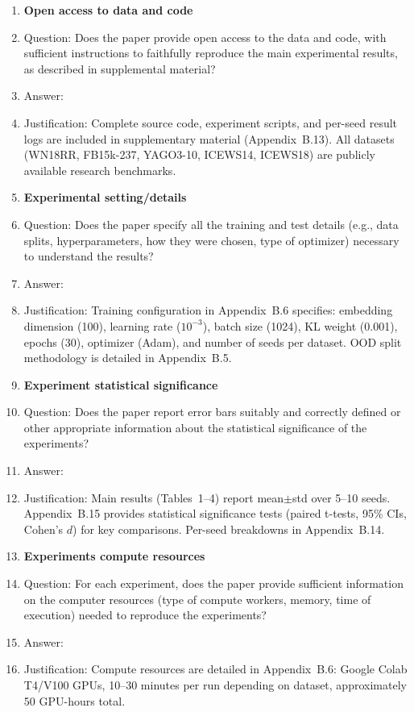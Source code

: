 \begin{enumerate}
\item {\bf Open access to data and code}
    \item[] Question: Does the paper provide open access to the data and code, with sufficient instructions to faithfully reproduce the main experimental results, as described in supplemental material?
    \item[] Answer: \answerYes{}
    \item[] Justification: Complete source code, experiment scripts, and per-seed result logs are included in supplementary material (Appendix~B.13). All datasets (WN18RR, FB15k-237, YAGO3-10, ICEWS14, ICEWS18) are publicly available research benchmarks.


\item {\bf Experimental setting/details}
    \item[] Question: Does the paper specify all the training and test details (e.g., data splits, hyperparameters, how they were chosen, type of optimizer) necessary to understand the results?
    \item[] Answer: \answerYes{}
    \item[] Justification: Training configuration in Appendix~B.6 specifies: embedding dimension (100), learning rate ($10^{-3}$), batch size (1024), KL weight (0.001), epochs (30), optimizer (Adam), and number of seeds per dataset. OOD split methodology is detailed in Appendix~B.5.

\item {\bf Experiment statistical significance}
    \item[] Question: Does the paper report error bars suitably and correctly defined or other appropriate information about the statistical significance of the experiments?
    \item[] Answer: \answerYes{}
    \item[] Justification: Main results (Tables~1--4) report mean$\pm$std over 5--10 seeds. Appendix~B.15 provides statistical significance tests (paired t-tests, 95\% CIs, Cohen's $d$) for key comparisons. Per-seed breakdowns in Appendix~B.14.

\item {\bf Experiments compute resources}
    \item[] Question: For each experiment, does the paper provide sufficient information on the computer resources (type of compute workers, memory, time of execution) needed to reproduce the experiments?
    \item[] Answer: \answerYes{}
    \item[] Justification: Compute resources are detailed in Appendix~B.6: Google Colab T4/V100 GPUs, 10--30 minutes per run depending on dataset, approximately 50 GPU-hours total.


\end{enumerate}
